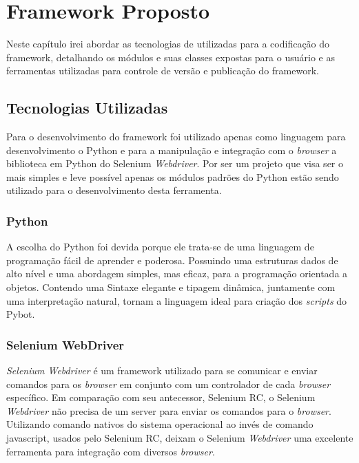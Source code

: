 %
%

\chapter{Framework Proposto}

    Neste capítulo irei abordar as tecnologias de utilizadas para a codificação do framework,
    detalhando os módulos e suas classes expostas para o usuário e as ferramentas utilizadas
    para controle de versão e publicação do framework.


    \section{Tecnologias Utilizadas}

        Para o desenvolvimento do framework foi utilizado apenas como linguagem para desenvolvimento o Python
        e para a manipulação e integração com o \emph{browser} a biblioteca em Python do Selenium \emph{Webdriver}. Por ser um
        projeto que visa ser o mais simples e leve possível apenas os módulos padrões do Python estão sendo utilizado
        para o desenvolvimento desta ferramenta.


        \subsection{Python}

            A escolha do Python \cite{Python} foi devida porque ele trata-se de uma linguagem de programação fácil de aprender e poderosa.
            Possuindo uma estruturas dados de alto nível e uma abordagem simples, mas eficaz, para a programação orientada
            a objetos. Contendo uma Sintaxe elegante e tipagem dinâmica, juntamente com uma interpretação natural, tornam
            a linguagem ideal para criação dos \emph{scripts} do Pybot.

        \subsection{Selenium WebDriver}
            \emph{Selenium Webdriver} \cite{webdriver} é um framework utilizado para se comunicar e enviar comandos para os \emph{browser}
            em conjunto com um controlador de cada \emph{browser} específico. Em comparação com seu antecessor, Selenium RC, o Selenium \emph{Webdriver}
            não precisa de um server para enviar os comandos para o \emph{browser}. Utilizando comando nativos do sistema operacional ao invés de
            comando javascript, usados pelo Selenium RC, deixam o Selenium \emph{Webdriver} uma excelente ferramenta para integração com diversos
            \emph{browser}.

